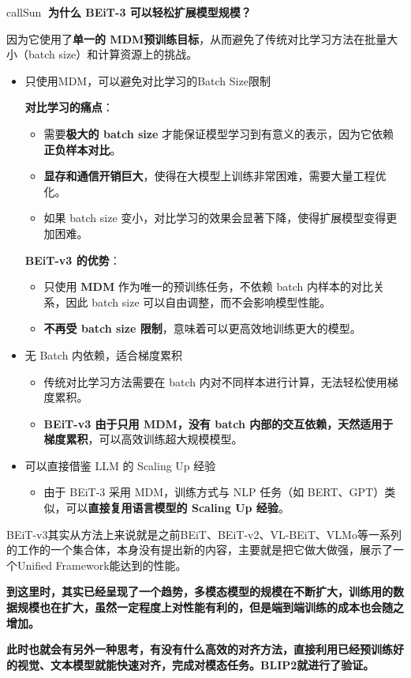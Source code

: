 \documentclass[zihao=false,fontset=windows]{ctexart}
\newcommand{\rb}[1]{\textcolor{feishuRed}{\textbf{#1}}}
\begin{document}
\begin{feishubox}{callSun}{🙋}
\rb{为什么 BEiT-3 可以轻松扩展模型规模？}\par
因为它使用了\textbf{单一的 MDM预训练目标}，从而避免了传统对比学习方法在批量大小（batch size）和计算资源上的挑战。\par
\begin{itemize}
\item 只使用MDM，可以避免对比学习的Batch Size限制
\par
\textbf{对比学习的痛点}：
\begin{itemize}
\item 需要\textbf{极大的 batch size} 才能保证模型学习到有意义的表示，因为它依赖\textbf{正负样本对比}。
\item \textbf{显存和通信开销巨大}，使得在大模型上训练非常困难，需要大量工程优化。
\item 如果 batch size 变小，对比学习的效果会显著下降，使得扩展模型变得更加困难。
\end{itemize}
\par
\textbf{BEiT-v3 的优势}：
\begin{itemize}
\item 只使用 \textbf{MDM} 作为唯一的预训练任务，不依赖 batch 内样本的对比关系，因此 batch size 可以自由调整，而不会影响模型性能。
\item \textbf{不再受 batch size 限制}，意味着可以更高效地训练更大的模型。
\end{itemize}
\item 无 Batch 内依赖，适合梯度累积
\begin{itemize}
\item 传统对比学习方法需要在 batch 内对不同样本进行计算，无法轻松使用梯度累积。
\item \textbf{BEiT-v3 由于只用 MDM，没有 batch 内部的交互依赖，天然适用于梯度累积}，可以高效训练超大规模模型。
\end{itemize}
\item 可以直接借鉴 LLM 的 Scaling Up 经验
\begin{itemize}
\item 由于 BEiT-3 采用 MDM，训练方式与 NLP 任务（如 BERT、GPT）类似，可以\textbf{直接复用语言模型的 Scaling Up 经验}。
\end{itemize}
\end{itemize}
\end{feishubox}

\par\vspace{1.15em}\par\vspace{0.28em}

BEiT-v3其实从方法上来说就是之前BEiT、BEiT-v2、VL-BEiT、VLMo等一系列的工作的一个集合体，本身没有提出新的内容，主要就是把它做大做强，展示了一个Unified Framework能达到的性能。\par

\textbf{到这里时，其实已经呈现了一个趋势，多模态模型的规模在不断扩大，训练用的数据规模也在扩大，虽然一定程度上对性能有利的，但是端到端训练的成本也会随之增加。}\par

\textbf{此时也就会有另外一种思考，有没有什么高效的对齐方法，直接利用已经预训练好的视觉、文本模型就能快速对齐，完成对模态任务。BLIP2就进行了验证。}\par
\end{document}
